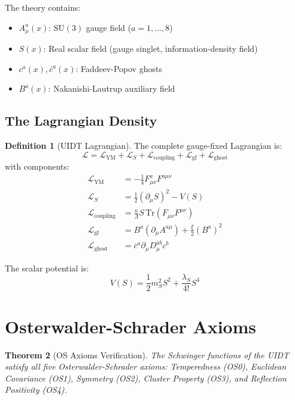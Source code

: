 \documentclass[11pt,a4paper]{article}
\newcommand{\Lagr}{\mathcal{L}}
\newcommand{\Tr}{\mathrm{Tr}}
\theoremstyle{plain}
\newtheorem{theorem}{Theorem}[section]
\theoremstyle{definition}
\newtheorem{definition}[theorem]{Definition}
\begin{document}
The theory contains:
\begin{itemize}
\item $A^a_\mu(x)$: $\mathrm{SU}(3)$ gauge field ($a = 1,\ldots,8$)
\item $S(x)$: Real scalar field (gauge singlet, information-density field)
\item $c^a(x), \bar{c}^a(x)$: Faddeev-Popov ghosts
\item $B^a(x)$: Nakanishi-Lautrup auxiliary field
\end{itemize}

\subsection{The Lagrangian Density}

\begin{definition}[UIDT Lagrangian]
\label{def:lagrangian}
The complete gauge-fixed Lagrangian is:
\begin{equation}
\Lagr = \Lagr_{\mathrm{YM}} + \Lagr_S + \Lagr_{\mathrm{coupling}} 
+ \Lagr_{\mathrm{gf}} + \Lagr_{\mathrm{ghost}}
\label{eq:full_lagrangian}
\end{equation}
with components:
\begin{align}
\Lagr_{\mathrm{YM}} &= -\frac{1}{4}F^a_{\mu\nu}F^{a\mu\nu} \\
\Lagr_S &= \frac{1}{2}(\partial_\mu S)^2 - V(S) \\
\Lagr_{\mathrm{coupling}} &= \frac{\kappa}{\Lambda}S\,\Tr(F_{\mu\nu}F^{\mu\nu}) \\
\Lagr_{\mathrm{gf}} &= B^a(\partial_\mu A^{a\mu}) + \frac{\xi}{2}(B^a)^2 \\
\Lagr_{\mathrm{ghost}} &= \bar{c}^a \partial_\mu D_\mu^{ab} c^b
\end{align}
\end{definition}

The scalar potential is:
\begin{equation}
V(S) = \frac{1}{2}m_S^2 S^2 + \frac{\lambda_S}{4!}S^4
\label{eq:potential}
\end{equation}

\section{Osterwalder-Schrader Axioms}
\label{sec:os}

\begin{theorem}[OS Axioms Verification]
The Schwinger functions of the UIDT satisfy all five Osterwalder-Schrader 
axioms: Temperedness (OS0), Euclidean Covariance (OS1), Symmetry (OS2), 
Cluster Property (OS3), and Reflection Positivity (OS4).
\end{theorem}
\end{document}
